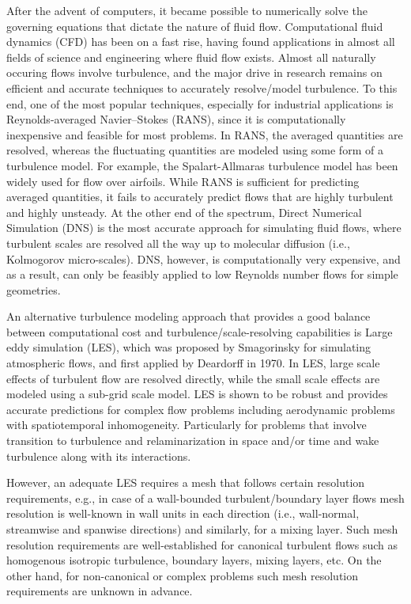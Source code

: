After the advent of computers, it became possible to numerically solve the governing equations that dictate the nature of fluid flow.
Computational fluid dynamics (CFD) has been on a fast rise, having found applications in almost all fields of science and engineering where fluid flow exists.
Almost all naturally occuring flows involve turbulence, and the major drive in research remains on efficient and accurate techniques to accurately resolve/model turbulence.
To this end, one of the most popular techniques, especially for industrial applications is Reynolds-averaged Navier–Stokes (RANS), since it is computationally inexpensive and feasible for most problems.
In RANS, the averaged quantities are resolved, whereas the fluctuating quantities are modeled using some form of a turbulence model. For example, the Spalart-Allmaras turbulence model \cite{bib:Spalart} has been widely used for flow over airfoils.
While RANS is sufficient for predicting averaged quantities, it fails to accurately predict flows that are highly turbulent and highly unsteady.
At the other end of the spectrum, Direct Numerical Simulation (DNS) is the most accurate approach for simulating fluid flows, where turbulent scales are resolved all the way up to molecular diffusion (i.e., Kolmogorov micro-scales).
DNS, however, is computationally very expensive, and as a result, can only be feasibly applied to low Reynolds number flows for simple geometries.

An alternative turbulence modeling approach that provides a good balance between computational cost and turbulence/scale-resolving capabilities is Large eddy simulation (LES), which was proposed by Smagorinsky \cite{bib:smag} for simulating atmospheric flows, and first applied by Deardorff \cite{bib:deardorff1970} in 1970.
In LES, large scale effects of turbulent flow are resolved directly, while the small scale effects are modeled using a sub-grid scale model.
LES is shown to be robust and provides accurate predictions for complex flow problems including aerodynamic problems with spatiotemporal inhomogeneity. Particularly for problems that involve transition to turbulence and relaminarization in space and/or time and wake turbulence along with its interactions.

However, an adequate LES requires a mesh that follows certain resolution requirements, e.g., in case of a wall-bounded turbulent/boundary layer flows mesh resolution is well-known in wall units in each direction (i.e., wall-normal, streamwise and spanwise directions) and similarly, for a mixing layer.
Such mesh resolution requirements are well-established for canonical turbulent flows such as homogenous isotropic turbulence, boundary layers, mixing layers, etc. 
On the other hand, for non-canonical or complex problems such mesh resolution requirements are unknown in advance. 

